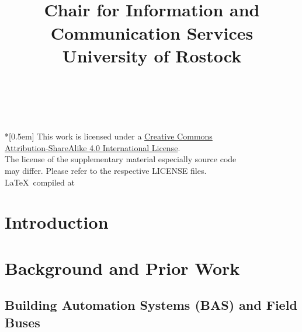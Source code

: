 \documentclass[12pt, a4paper, titlepage, oneside, final]{book}
\title{\thetitle\\[24pt]
	\small Chair for Information and Communication Services\\[-3pt]
	\small University of Rostock}
\author{\theauthor}
\date{\thedate}
\begin{document}
	
	~ \vfill
	\begin{flushright}
		\tiny \noindent
		{\normalsize \href{http://creativecommons.org/licenses/by-sa/4.0/}{\ccbysa}} \\*[0.5em]
		This work is licensed under a \href{http://creativecommons.org/licenses/by-sa/4.0/}{Creative Commons\\%
		Attribution-ShareAlike 4.0 International License}. \\
		The license of the supplementary material especially source code\\%
		may differ. Please refer to the respective LICENSE files.\\
		\LaTeX ~compiled at \DTMnow
	\end{flushright}
	\pagebreak
	\clearpage
	\setcounter{page}{1}
	\tableofcontents
	\listoffigures{}
	\listoftables{}
	
	\newpage
	
	\chapter{Introduction}
	\label{sec:intro}
	
	
	\chapter{Background and Prior Work}
	\section{Building Automation Systems (BAS) and Field Buses}
	\label{sec:background:bas}
	
	
\end{document}
